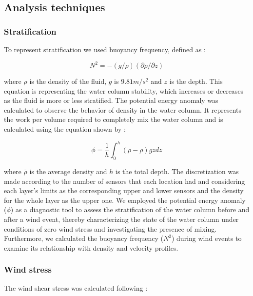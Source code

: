 \documentclass[tesis.tex]{subfiles}
\begin{document}
\subsection{Analysis techniques}

\subsubsection{Stratification}

To represent stratification we used buoyancy frequency, defined as \citep{kundu2002fluid}:

\begin{equation}
    N^2 = -(g/\rho)(\partial \rho/\partial z)
    \label{eq: N2}
\end{equation}

where $\rho$ is the density of the fluid, $g$ is $9.81 m/s^2$ and $z$ is the depth. This equation is representing the water column stability, which increases or decreases as the fluid is more or less stratified. The potential energy anomaly was calculated to observe the behavior of density in the water column. It represents the work per volume required to completely mix the water column and is calculated using the equation shown by \cite{simpson1990tidal}: 

\begin{equation}
    \phi=\frac{1}{h}\int^h_0(\bar{\rho}-\rho)gzdz
    \label{eq: phi}
\end{equation}

where $\bar{\rho}$ is the average density and $h$ is the total depth. The discretization was made according to the number of sensors that each location had and considering each layer's limits as the corresponding upper and lower sensors and the density for the whole layer as the upper one. We employed the potential energy anomaly ($\phi$) as a diagnostic tool to assess the stratification of the water column before and after a wind event, thereby characterizing the state of the water column under conditions of zero wind stress and investigating the presence of mixing. Furthermore, we calculated the buoyancy frequency ($N^2$) during wind events to examine its relationship with density and velocity profiles.

\subsubsection{Wind stress}

The wind shear stress was calculated following \cite{read2011derivation}: 
\end{document}
